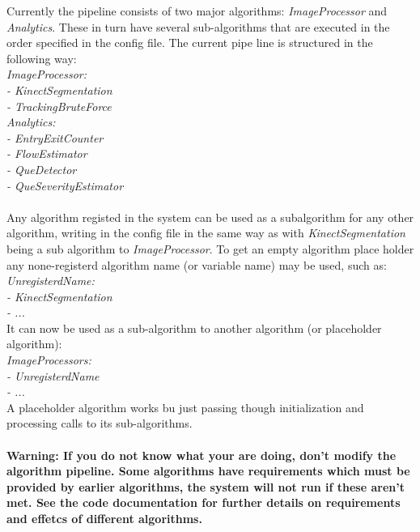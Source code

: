 \newpage
Currently the pipeline consists of two major algorithms: \textit{ImageProcessor} and \textit{Analytics}. These in turn have several sub-algorithms that are executed in the order specified in the config file. The current pipe line is structured in the following way: \\
\hspace*{0.5cm}\textit{ImageProcessor:\\
\hspace*{1cm}- KinectSegmentation\\
\hspace*{1cm}- TrackingBruteForce}\\
\hspace*{0.5cm}\textit{Analytics:\\
\hspace*{1cm}- EntryExitCounter\\
\hspace*{1cm}- FlowEstimator\\
\hspace*{1cm}- QueDetector\\
\hspace*{1cm}- QueSeverityEstimator}\\\\
 Any algorithm registed in the system can be used as a subalgorithm for any other algorithm, writing in the config file in the same way as with \textit{KinectSegmentation} being a sub algorithm to \textit{ImageProcessor}. To get an empty algorithm place holder any none-registerd algorithm name (or variable name) may be used, such as:\\
\hspace*{0.5cm}\textit{UnregisterdName:\\
\hspace*{1cm}- KinectSegmentation\\
\hspace*{1cm}- ...}\\
It can now be used as a sub-algorithm to another algorithm (or placeholder algorithm):\\
\hspace*{0.5cm}\textit{ImageProcessors:\\
\hspace*{1cm}- UnregisterdName\\
\hspace*{1cm}- ...}\\
A placeholder algorithm works bu just passing though initialization and processing calls to its sub-algorithms.\\\\
\textbf{Warning: If you do not know what your are doing, don't modify the algorithm pipeline. Some algorithms have requirements which must be provided by earlier algorithms, the system will not run if these aren't met. See the code documentation for further details on requirements and effetcs of different algorithms.}

